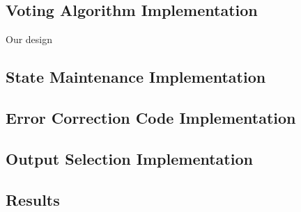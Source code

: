 \subsection{Voting Algorithm Implementation}
Our design 

\subsection{State Maintenance Implementation}

\subsection{Error Correction Code Implementation}

\subsection{Output Selection Implementation}

\subsection{Results}

